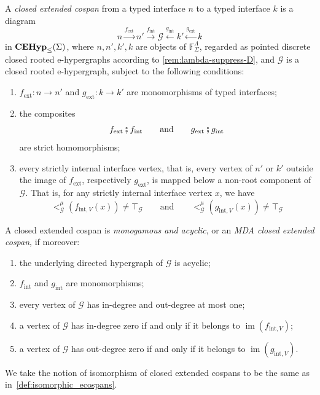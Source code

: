 \begin{definition}
\label{def:lambda-extended-cospan}
A \emph{closed extended cospan} from a typed interface \(n\) to a
typed interface \(k\) is a diagram
\[
  n
  \xrightarrow{f_{\mathrm{ext}}}
  n'
  \xrightarrow{f_{\mathrm{int}}}
  \mathcal G
  \xleftarrow{g_{\mathrm{int}}}
  k'
  \xleftarrow{g_{\mathrm{ext}}}
  k
\]
in \(\mathbf{CEHyp}_{\leq}(\Sigma)\), where
\(n,n',k',k\) are objects of \(\mathbb F^\Lambda_\Sigma\), regarded as
pointed discrete closed rooted e-hypergraphs according to
\cref{rem:lambda-suppress-D}, and \(\mathcal G\) is a closed rooted
e-hypergraph, subject to the following conditions:

\begin{enumerate}
  \item
  \(f_{\mathrm{ext}}:n\to n'\) and
  \(g_{\mathrm{ext}}:k\to k'\) are monomorphisms of typed interfaces;

  \item
  the composites
  \[
    f_{\mathrm{ext}}\fatsemi f_{\mathrm{int}}
    \qquad\text{and}\qquad
    g_{\mathrm{ext}}\fatsemi g_{\mathrm{int}}
  \]
  are strict homomorphisms;

  \item
  every strictly internal interface vertex, that is, every vertex of
  \(n'\) or \(k'\) outside the image of \(f_{\mathrm{ext}}\), respectively
  \(g_{\mathrm{ext}}\), is mapped below a non-root component of
  \(\mathcal G\).
  That is, for any strictly internal interface vertex \(x\), we have
  \[
    <^{\mu}_{\mathcal{G}}(f_{\mathrm{int},V}(x)) \neq \top_{\mathcal{G}} \qquad \text{and} \qquad <^{\mu}_{\mathcal{G}}(g_{\mathrm{int},V}(x)) \neq \top_{\mathcal{G}}
  \]
\end{enumerate}

A closed extended cospan is \emph{monogamous and acyclic}, or an
\emph{MDA closed extended cospan}, if moreover:

\begin{enumerate}
  \item the underlying directed hypergraph of \(\mathcal G\) is
  acyclic;

  \item \(f_{\mathrm{int}}\) and \(g_{\mathrm{int}}\) are
  monomorphisms;

  \item every vertex of \(\mathcal G\) has in-degree and out-degree at
  most one;

  \item a vertex of \(\mathcal G\) has in-degree zero if and only if it
  belongs to
  \(\operatorname{im}(f_{\mathrm{int},V})\);

  \item a vertex of \(\mathcal G\) has out-degree zero if and only if it
  belongs to
  \(\operatorname{im}(g_{\mathrm{int},V})\).
\end{enumerate}
We take the notion of isomorphism of closed extended cospans to be the same as in~\cref{def:isomorphic_ecospans}.
\end{definition}

